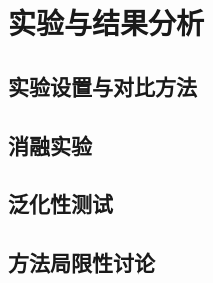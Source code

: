 \section{实验与结果分析}

\subsection{实验设置与对比方法}

\subsection{消融实验}


\subsection{泛化性测试}


\subsection{方法局限性讨论}
